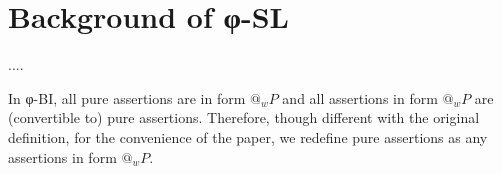 \section{Background of φ-SL}

....

In φ-BI, all pure assertions are in form $@_w P$ and all assertions in form $@_w P$ are (convertible to) pure assertions. Therefore, though different with the original definition, for the convenience of the paper, we redefine pure assertions as any assertions in form $@_w P$.

